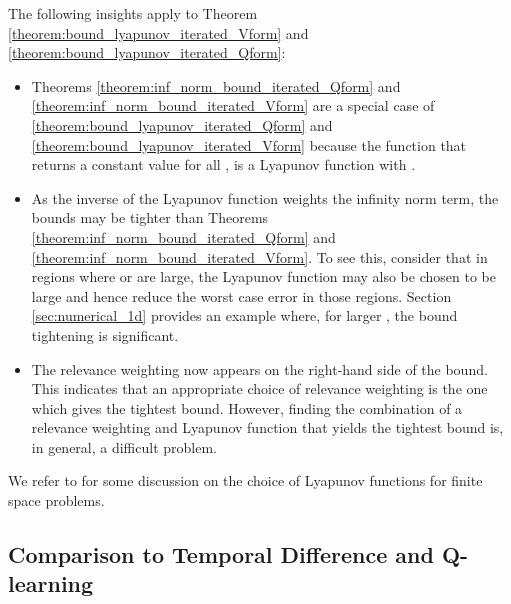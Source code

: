 \documentclass[journal]{IEEEtran}
\newcommand{\textQ}{Q}
\begin{document}
The following insights apply to Theorem \ref{theorem:bound_lyapunov_iterated_Vform} and \ref{theorem:bound_lyapunov_iterated_Qform}:
\begin{itemize}
	\item Theorems \ref{theorem:inf_norm_bound_iterated_Qform} and \ref{theorem:inf_norm_bound_iterated_Vform} are a special case of \ref{theorem:bound_lyapunov_iterated_Qform} and \ref{theorem:bound_lyapunov_iterated_Vform} because the function that returns a constant value for all ,  is a Lyapunov function with .
	
	\item As the inverse of the Lyapunov function weights the infinity norm term, the bounds may be tighter than Theorems \ref{theorem:inf_norm_bound_iterated_Qform} and \ref{theorem:inf_norm_bound_iterated_Vform}. To see this, consider that in regions where  or  are large, the Lyapunov function may also be chosen to be large and hence reduce the worst case error in those regions. Section \ref{sec:numerical_1d} provides an example where, for larger , the bound tightening is significant.
	
	\item The relevance weighting now appears on the right-hand side of the bound. This indicates that an appropriate choice of relevance weighting is the one which gives the tightest bound. However, finding the combination of a relevance weighting and Lyapunov function that yields the tightest bound is, in general, a difficult problem.
\end{itemize}

We refer to \cite[\S 5]{vanRoy_linApproxDP} for some discussion on the choice of Lyapunov functions for finite space problems.
















\subsection{Comparison to Temporal Difference and \textQ-learning} \label{sec:unify:qlearning_comparison}
\end{document}
